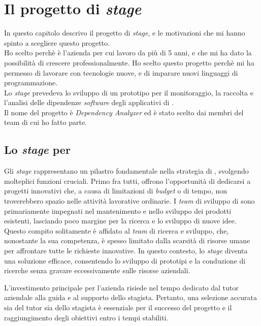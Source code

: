 \chapter{Il progetto di \textit{stage}}
\label{cap:ilprogettodistage}

In questo capitolo descrivo il progetto di \textit{stage}, e le motivazioni che mi hanno spinto a scegliere questo progetto.\\
Ho scelto {\azienda} perchè è l'azienda per cui lavoro da più di 5 anni, e che mi ha dato la possibilità di crescere professionalmente.
Ho scelto questo progetto perchè mi ha permesso di lavorare con tecnologie nuove, e di imparare nuovi linguaggi di programmazione.\\
Lo \textit{stage} prevedeva lo sviluppo di un prototipo per il monitoraggio, la raccolta e l'analisi delle dipendenze \textit{software} degli applicativi di {\azienda}.\\
Il nome del progetto è \textit{Dependency Analyzer} ed è stato scelto dai membri del team di cui ho fatto parte.\\
\section{Lo \textit{stage} per \azienda}

Gli \textit{stage} rappresentano un pilastro fondamentale nella strategia di {\azienda}, svolgendo molteplici funzioni cruciali. 
Primo fra tutti, offrono l'opportunità di dedicarsi a progetti innovativi che, a causa di limitazioni di \textit{budget} o di tempo, 
non troverebbero spazio nelle attività lavorative ordinarie. I \textit{team} di sviluppo di {\azienda} sono primariamente impegnati 
nel mantenimento e nello sviluppo dei prodotti esistenti, lasciando poco margine per la ricerca e lo sviluppo di nuove idee. 
Questo compito solitamente è affidato al \textit{team} di ricerca e sviluppo, che, nonostante la sua competenza, è spesso limitato dalla scarsità 
di risorse umane per affrontare tutte le richieste innovative. In questo contesto, lo \textit{stage} diventa una soluzione efficace, 
consentendo lo sviluppo di prototipi e la conduzione di ricerche senza gravare eccessivamente sulle risorse aziendali.

L'investimento principale per l'azienda risiede nel tempo dedicato dal tutor aziendale alla guida e al supporto dello stagista. 
Pertanto, una selezione accurata sia del tutor sia dello stagista è essenziale per il successo del progetto e il raggiungimento 
degli obiettivi entro i tempi stabiliti.

